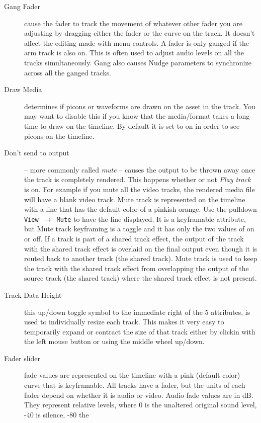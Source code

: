 \begin{description}
\item[Gang Fader] cause the fader to track the movement of
  whatever other fader you are adjusting by dragging either the fader
  or the curve on the track.  It doesn't affect the editing made with
  menu controls.  A fader is only ganged if the arm track is also on.
  This is often used to adjust audio levels on all the tracks
  simultaneously.  Gang also causes Nudge parameters to synchronize
  across all the ganged tracks.
\item[Draw Media] determines if picons or waveforms are drawn on
  the asset in the track.  You may want to disable this if you know
  that the media/format takes a long time to draw on the timeline.  By
  default it is set to on in order to see picons on the timeline.
\item[Don’t send to output] -- more commonly called
  \textit{mute} -- causes the output to be thrown away once the track is
  completely rendered. This happens whether or not \textit{Play track}
  is on.  For example if you mute all the video tracks, the rendered
  media file will have a blank video track.  Mute track is represented
  on the timeline with a line that has the default color of a
  pinkish-orange.  Use the pulldown \texttt{View $\rightarrow$ Mute} to
  have the line displayed.  It is a keyframable attribute, but Mute
  track keyframing is a toggle and it has only the two values of on or
  off. If a track is part of a shared track effect, the output of the
  track with the shared track effect is overlaid on the final output
  even though it is routed back to another track (the shared track).
  Mute track is used to keep the track with the shared track effect
  from overlapping the output of the source track (the shared track)
  where the shared track effect is not present.
\item[Track Data Height] this up/down toggle symbol to the immediate right
of the 5 attributes, is used to individually resize each track.  This makes
it very easy to temporarily expand or contract the size of that track either
by clickin with the left mouse button or using the middle wheel up/down.
\item[Fader slider] fade values are represented on the timeline
  with a pink (default color) curve that is keyframable.  All tracks have a fader, but
  the units of each fader depend on whether it is audio or video.
  Audio fade values are in dB. They represent relative levels, where 0
  is the unaltered original sound level, -40 is silence, -80 the

\end{description}
